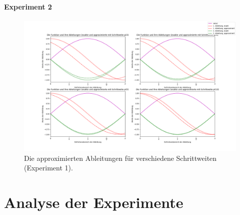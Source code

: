 \documentclass[smallheadings]{scrartcl}
\begin{document}
\paragraph {Experiment 2}



\begin{figure}
	\includegraphics[width=\linewidth]{4Bilder.png}
	\caption{Die approximierten Ableitungen für verschiedene Schrittweiten (Experiment 1).}
	\label{im:ablplot}
\end{figure}

\section{Analyse der Experimente}
\end{document}
